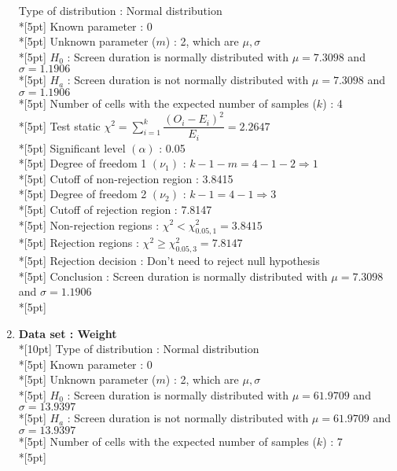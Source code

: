 \begin{enumerate}
        Type of distribution : Normal distribution\\*[5pt]
        Known parameter : 0\\*[5pt]
        Unknown parameter ($m$) : 2, which are \(\mu, \sigma\)\\*[5pt]
        $H_0$ : Screen duration is normally distributed with $\mu=7.3098$ and $\sigma=1.1906$\\*[5pt]
        $H_a$ : Screen duration is not normally distributed with $\mu=7.3098$ and $\sigma=1.1906$\\*[5pt]
        Number of cells with the expected number of samples ($k$) : 4\\*[5pt]
        Test static \(\chi^2=\displaystyle\sum\limits^k_{i=1}\dfrac{\left(O_i-E_i\right)^2}{E_i}=2.2647\)\\*[5pt]
        Significant level \(\left(\alpha\right)\) : 0.05\\*[5pt]
        Degree of freedom 1 \((\nu_1)\) : $k - 1 - m = 4 - 1 - 2 \Rightarrow 1$\\*[5pt]
        Cutoff of non-rejection region : 3.8415\\*[5pt]
        Degree of freedom 2 \((\nu_2)\) : $k - 1 = 4 - 1 \Rightarrow 3$\\*[5pt]
        Cutoff of rejection region : 7.8147\\*[5pt]
        Non-rejection regions : \(\chi^2 < \chi^2_{0.05, 1}=3.8415\)\\*[5pt]
        Rejection regions : \(\chi^2 \geq \chi^2_{0.05, 3}=7.8147\)\\*[5pt]
        Rejection decision : Don't need to reject null hypothesis\\*[5pt]
        Conclusion : Screen duration is normally distributed with $\mu=7.3098$ and $\sigma=1.1906$\\*[5pt]
    \item \textbf{Data set : Weight}\\*[10pt]
        Type of distribution : Normal distribution\\*[5pt]
        Known parameter : 0\\*[5pt]
        Unknown parameter ($m$) : 2, which are \(\mu, \sigma\)\\*[5pt]
        $H_0$ : Screen duration is normally distributed with $\mu=61.9709$ and $\sigma=13.9397$\\*[5pt]
        $H_a$ : Screen duration is not normally distributed with $\mu=61.9709$ and $\sigma=13.9397$\\*[5pt]
        Number of cells with the expected number of samples ($k$) : 7\\*[5pt]

\end{enumerate}
